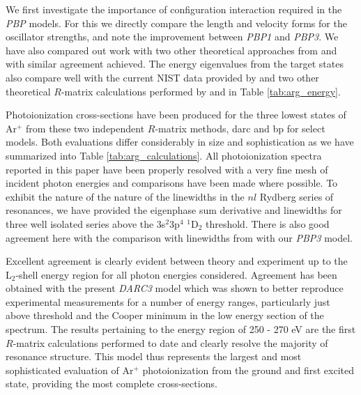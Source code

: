 We first investigate the importance of configuration interaction required in the \textit{PBP} models. For this we directly compare the length and velocity forms for the oscillator strengths, and note the improvement between \textit{PBP1} and \textit{PBP3}. We have also compared out work with two other theoretical approaches from \citet{2006ADNDT..92..607F} and \citet{2001JQSRT..69..171L} with similar agreement achieved. The energy eigenvalues from the target states also compare well with the current NIST data provided by \citet{2010JPCRD..39c3101S} and two other theoretical $R$-matrix calculations performed by \citet{2012EPJD...66...84S} and \citet{2009A&A...500.1253M} in Table \ref{tab:arg_energy}.

Photoionization cross-sections have been produced for the three lowest states of Ar$^{+}$ from these two independent $R$-matrix methods, {\sc darc} and {\sc bp} for select models. Both evaluations differ considerably in size and sophistication as we have summarized into Table \ref{tab:arg_calculations}. All photoionization spectra reported in this paper have been properly resolved with a very fine mesh of incident photon energies and comparisons have been made where possible. To exhibit the nature of the nature of the linewidths in the $nl$ Rydberg series of resonances, we have provided the eigenphase sum derivative and linewidths for three well isolated series above the 3s$^2$3p$^4$ $^1$D$_2$ threshold. There is also good agreement here with the comparison with linewidths from \citet{2011PhRvA..84a3413C} with our \textit{PBP3} model.

Excellent agreement is clearly evident between theory and experiment up to the L$_{2}$-shell energy region for all photon energies considered. Agreement has been obtained with the present \textit{DARC3} model which was shown to better reproduce experimental measurements for a number of energy ranges, particularly just above threshold and the Cooper minimum in the low energy section of the spectrum. The results pertaining to the energy region of 250 - 270 eV are the first $R$-matrix calculations performed to date and clearly resolve the majority of resonance structure. This model thus represents the largest and most sophisticated evaluation of Ar$^{+}$ photoionization from the ground and first excited state, providing the most complete cross-sections.




